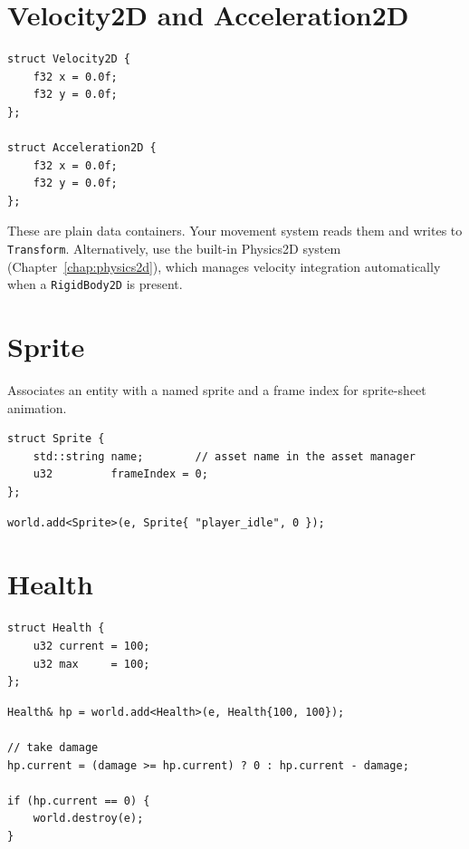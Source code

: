 \section{Velocity2D and Acceleration2D}

\begin{lstlisting}
struct Velocity2D {
    f32 x = 0.0f;
    f32 y = 0.0f;
};

struct Acceleration2D {
    f32 x = 0.0f;
    f32 y = 0.0f;
};
\end{lstlisting}

These are plain data containers. Your movement system reads them and writes
to \texttt{Transform}. Alternatively, use the built-in Physics2D system
(Chapter~\ref{chap:physics2d}), which manages velocity integration
automatically when a \texttt{RigidBody2D} is present.

\section{Sprite}

Associates an entity with a named sprite and a frame index for sprite-sheet
animation.

\begin{lstlisting}
struct Sprite {
    std::string name;        // asset name in the asset manager
    u32         frameIndex = 0;
};
\end{lstlisting}

\begin{lstlisting}
world.add<Sprite>(e, Sprite{ "player_idle", 0 });
\end{lstlisting}

\section{Health}

\begin{lstlisting}
struct Health {
    u32 current = 100;
    u32 max     = 100;
};
\end{lstlisting}

\begin{lstlisting}
Health& hp = world.add<Health>(e, Health{100, 100});

// take damage
hp.current = (damage >= hp.current) ? 0 : hp.current - damage;

if (hp.current == 0) {
    world.destroy(e);
}
\end{lstlisting}

